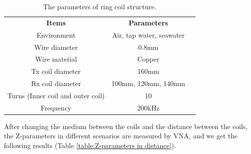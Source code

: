 \begin{table}[!b]
    \centering
    \caption{The parameters of ring coil structure.}
    \begin{tabular}{ c|cc }
        \thickhline
        \textbf{Items}                    & \textbf{Parameters}      \\
        \thickhline
        Environment                       & Air, tap water, seawater \\ \hline
        Wire diameter                     & 0.8mm                    \\ \hline
        Wire material                     & Copper                   \\
        \hline
        Tx coil diameter                  & 160mm                    \\ \hline
        Rx coil diameter                  & 100mm, 120mm, 140mm      \\ \hline
        Turns (Inner coil and outer coil) & 10                       \\ \hline
        Frequency                         & 200kHz                   \\ \hline
    \end{tabular}
    \label{table:ring coil parameters - different distance}
\end{table}

After changing the medium between the coils and the distance between the coils, the Z-parameters in different scenarios are measured by VNA, and we get the following results (Table \ref{table:Z-parameters in distance}).

\newcommand\Tstrut{\rule{0pt}{2.3em}}         %
\newcommand\Bstrut{\rule[-1.8em]{0pt}{0pt}}   %

